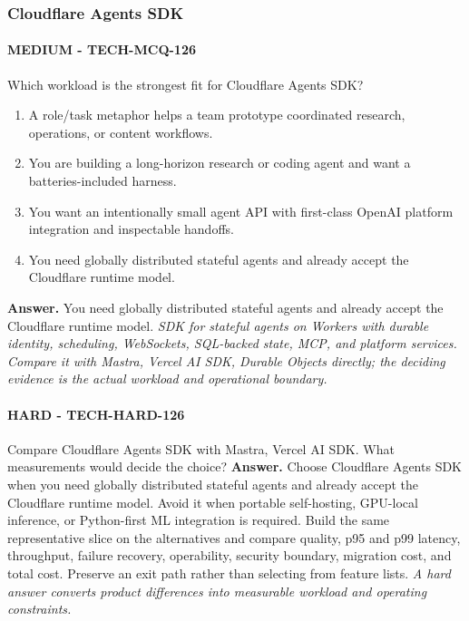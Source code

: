 \subsubsection*{Cloudflare Agents SDK}
\paragraph{MEDIUM - TECH-MCQ-126} Which workload is the strongest fit for Cloudflare Agents SDK?
\begin{enumerate}[label=\Alph*.]
\item A role/task metaphor helps a team prototype coordinated research, operations, or content workflows.
\item You are building a long-horizon research or coding agent and want a batteries-included harness.
\item You want an intentionally small agent API with first-class OpenAI platform integration and inspectable handoffs.
\item You need globally distributed stateful agents and already accept the Cloudflare runtime model.
\end{enumerate}
\textbf{Answer.} You need globally distributed stateful agents and already accept the Cloudflare runtime model.
\textit{SDK for stateful agents on Workers with durable identity, scheduling, WebSockets, SQL-backed state, MCP, and platform services. Compare it with Mastra, Vercel AI SDK, Durable Objects directly; the deciding evidence is the actual workload and operational boundary.}
\paragraph{HARD - TECH-HARD-126} Compare Cloudflare Agents SDK with Mastra, Vercel AI SDK. What measurements would decide the choice?
\textbf{Answer.} Choose Cloudflare Agents SDK when you need globally distributed stateful agents and already accept the Cloudflare runtime model. Avoid it when portable self-hosting, GPU-local inference, or Python-first ML integration is required. Build the same representative slice on the alternatives and compare quality, p95 and p99 latency, throughput, failure recovery, operability, security boundary, migration cost, and total cost. Preserve an exit path rather than selecting from feature lists.
\textit{A hard answer converts product differences into measurable workload and operating constraints.}
